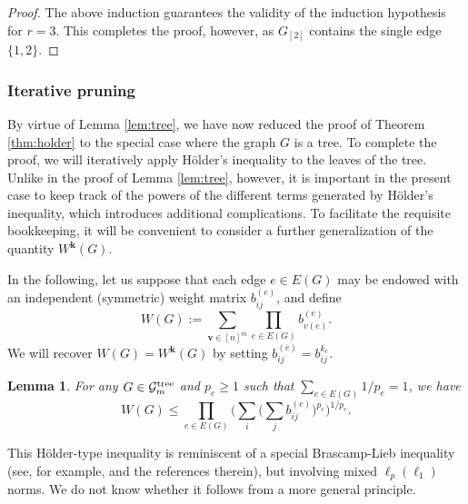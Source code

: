 \documentclass[10pt,reqno]{amsart}
\newtheorem{lem}[thm]{Lemma}
\theoremstyle{definition}
\numberwithin{equation}{section}
\numberwithin{figure}{section}
\numberwithin{table}{section}
\begin{document}
\begin{proof}
The above induction guarantees the validity of the induction hypothesis
for $r=3$. This completes the proof, however, as $G_{[2]}$ contains the
single edge $\{1,2\}$.
\end{proof}

\subsubsection{Iterative pruning}

By virtue of Lemma \ref{lem:tree}, we have now reduced the proof of 
Theorem \ref{thm:holder} to the special case where the graph $G$ is a 
tree. To complete the proof, we will iteratively apply H\"older's 
inequality to the leaves of the tree. Unlike in the proof of Lemma 
\ref{lem:tree}, however, it is important in the present case to keep track 
of the powers of the different terms generated by H\"older's inequality, 
which introduces additional complications. To facilitate the requisite 
bookkeeping, it will be convenient to consider a further generalization of 
the quantity $W^{\mathbf{k}}(G)$.

In the following, let us suppose that each edge $e\in E(G)$ may be endowed 
with an independent (symmetric) weight matrix $b^{(e)}_{ij}$, and define
$$
	W(G) := 
	\sum_{\mathbf{v}\in[n]^m}
	\prod_{e\in E(G)} b_{v(e)}^{(e)}.
$$
We will recover $W(G)=W^{\mathbf{k}}(G)$ by setting $b^{(e)}_{ij}=b_{ij}^{k_e}$.

\begin{lem}
\label{lem:bizarrobl}
For any $G\in\mathcal{G}_m^{\rm tree}$ and $p_e\ge 1$ such that
$\sum_{e\in E(G)} 1/p_e=1$, we have
$$
	W(G) \le
	\prod_{e\in E(G)}
	\Bigg(
	\sum_i\Bigg(
	\sum_j b_{ij}^{(e)}\Bigg)^{p_e}
	\Bigg)^{1/p_e}.
$$
\end{lem}

This H\"older-type inequality is reminiscent of a special Brascamp-Lieb 
inequality (see, for example, \cite{BCCT10} and the references therein), 
but involving mixed $\ell_p(\ell_1)$ norms. We do not know whether it 
follows from a more general principle.
\end{document}
